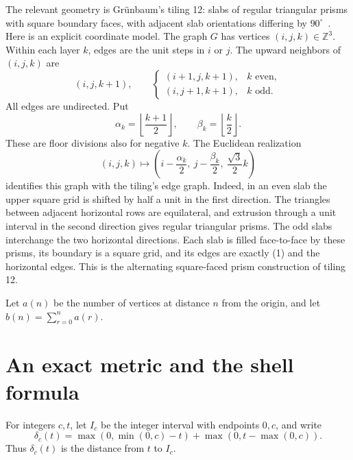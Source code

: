 \documentclass[10pt]{article}
\newcommand{\Z}{\mathbb Z}
\begin{document}
The relevant geometry is Gr\"unbaum's tiling 12: slabs of regular
triangular prisms with square boundary faces, with adjacent slab
orientations differing by $90^\circ$~\cite[pp.~52,55]{grunbaum}.
Here is an explicit coordinate model. The graph $G$ has vertices
$(i,j,k)\in\Z^3$. Within each layer $k$, edges are the unit steps in
$i$ or $j$. The upward neighbors of $(i,j,k)$ are
\[
 (i,j,k+1),\qquad
 \begin{cases}(i+1,j,k+1),&k\text{ even},\\
 (i,j+1,k+1),&k\text{ odd}.
 \end{cases}                                                    \tag{1}
\]
All edges are undirected. Put
\[
 \alpha_k=\left\lfloor\frac{k+1}{2}\right\rfloor,\qquad
 \beta_k=\left\lfloor\frac{k}{2}\right\rfloor.
\]
These are floor divisions also for negative $k$.
The Euclidean realization
\[
 (i,j,k)\longmapsto
 \left(i-\frac{\alpha_k}{2},\ j-\frac{\beta_k}{2},\ \frac{\sqrt3}{2}k\right)
                                                                  \tag{2}
\]
identifies this graph with the tiling's edge graph. Indeed, in an even
slab the upper square grid is shifted by half a unit in the first
direction. The triangles between adjacent horizontal rows are
equilateral, and extrusion through a unit interval in the second
direction gives regular triangular prisms. The odd slabs interchange
the two horizontal directions. Each slab is filled face-to-face by
these prisms, its boundary is a square grid, and its edges are exactly
(1) and the horizontal edges. This is the alternating square-faced
prism construction of tiling 12.

Let $a(n)$ be the number of vertices at distance $n$ from the origin,
and let $b(n)=\sum_{r=0}^n a(r)$.

\section{An exact metric and the shell formula}
For integers $c,t$, let $I_c$ be the integer interval with endpoints
$0,c$, and write
\[
 \delta_c(t)=\max(0,\min(0,c)-t)+\max(0,t-\max(0,c)).
\]
Thus $\delta_c(t)$ is the distance from $t$ to $I_c$.
\end{document}

